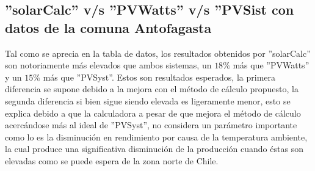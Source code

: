 \newpage
\subsection{''solarCalc'' v/s ''PVWatts'' v/s ''PVSist con datos de la comuna Antofagasta}
\begin{table}[h!]
\caption{Comparación de software con datos de Antofagasta}
\end{table}
Tal como se aprecia en la tabla de datos, los resultados obtenidos por ''solarCalc'' son notoriamente más elevados que ambos sistemas, un $18\%$ más que ''PVWatts'' y un $15\%$ más que ''PVSyst''. Estos son resultados esperados, la primera diferencia se supone debido a la mejora con el método de cálculo propuesto, la segunda diferencia si bien sigue siendo elevada es ligeramente menor, esto se explica debido a que la calculadora a pesar de que mejora el método de cálculo acercándose más al ideal de ''PVSyst'', no considera un parámetro importante como lo es la disminución en rendimiento por causa de la temperatura ambiente, la cual produce una significativa disminución de la producción cuando éstas son elevadas como se puede espera de la zona norte de Chile.

